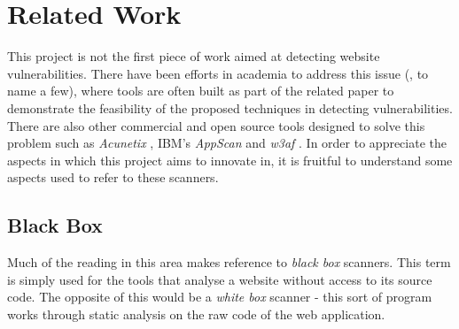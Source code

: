 \section{Related Work}

This project is not the first piece of work aimed at detecting website vulnerabilities. There have been efforts in academia to address this issue (\cite{Saner, stateAwareBlackBoxWebVulnScanner, Waler, Kals:2006:SWV:1135777.1135817}, to name a few), where tools are often built as part of the related paper to demonstrate the feasibility of the proposed techniques in detecting vulnerabilities. There are also other commercial and open source tools designed to solve this problem such as \textit{Acunetix} \cite{acunetix}, IBM's \textit{AppScan} \cite{appscan} and \textit{w3af} \cite{w3af}. In order to appreciate the aspects in which this project aims to innovate in, it is fruitful to understand some aspects used to refer to these scanners.

\subsection{Black Box}

Much of the reading in this area makes reference to \textit{black box} scanners. This term is simply used for the tools that analyse a website without access to its source code. The opposite of this would be a \textit{white box} scanner - this sort of program works through static analysis on the raw code of the web application.

